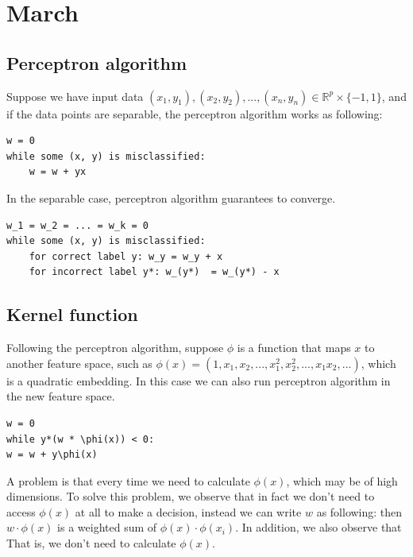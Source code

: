 \chapter{March}

\section{Perceptron algorithm} 
Suppose we have input data $(x_1, y_1), (x_2, y_2), ..., (x_n, y_n) \in \mathbb{R}^p \times \{-1, 1\}$, 
and if the data points are separable, the perceptron algorithm works as following:

\begin{verbatim}
w = 0
while some (x, y) is misclassified:
    w = w + yx
\end{verbatim}

\begin{remark}
In the separable case, perceptron algorithm guarantees to converge.
\end{remark}

\begin{verbatim}
w_1 = w_2 = ... = w_k = 0
while some (x, y) is misclassified:
    for correct label y: w_y = w_y + x
    for incorrect label y*: w_(y*)  = w_(y*) - x
\end{verbatim}

\section{Kernel function} 
Following the perceptron algorithm, suppose $\phi$ is a function that maps $x$ to another feature space, such as $\phi(x) = (1, x_1, x_2, ..., x_1^2, x_2^2,..., x_1 x_2,...)$, which is a quadratic embedding.
In this case we can also run perceptron algorithm in the new feature space. 

\begin{verbatim}
w = 0
while y*(w * \phi(x)) < 0:
w = w + y\phi(x)
\end{verbatim}

A problem is that every time we need to calculate $\phi(x)$, which may be of high dimensions. To solve this problem, we observe that in fact we don't need to access $\phi(x)$ at all to make a decision, instead we
can write $w$ as following:
then $w\cdot\phi(x)$ is a weighted sum of $\phi(x)\cdot\phi(x_i)$. In addition, we also observe that
That is, we don't need to calculate $\phi(x)$.


